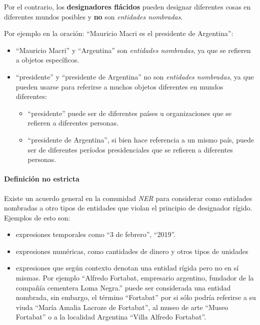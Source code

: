 \documentclass[12pt,a4paper,]{scrartcl}
\providecommand{\tightlist}{%
  \setlength{\itemsep}{0pt}\setlength{\parskip}{0pt}}
\let\oldparagraph\paragraph
\renewcommand{\paragraph}[1]{\oldparagraph{#1}\mbox{}}
\begin{document}
Por el contrario, los \textbf{designadores flácidos} pueden designar diferentes cosas en diferentes mundos posibles y \textbf{no} son \emph{entidades nombradas}.

Por ejemplo en la oración: \enquote{Mauricio Macri es el presidente de Argentina}:

\begin{itemize}
\tightlist
\item
  \enquote{Mauricio Macri} y \enquote{Argentina} son \emph{entidades nombradas}, ya que se refieren a objetos específicos.
\item
  \enquote{presidente} y \enquote{presidente de Argentina} no son \emph{entidades nombradas}, ya que pueden usarse para referirse a muchos objetos diferentes en mundos diferentes:

  \begin{itemize}
  \tightlist
  \item
    \enquote{presidente} puede ser de diferentes países u organizaciones que se refieren a diferentes personas.
  \item
    \enquote{presidente de Argentina}, si bien hace referencia a un mismo país, puede ser de diferentes períodos presidenciales que se refieren a diferentes personas.
  \end{itemize}
\end{itemize}

\hypertarget{definiciuxf3n-no-estricta}{%
\paragraph{Definición no estricta}\label{definiciuxf3n-no-estricta}}

Existe un acuerdo general en la comunidad \emph{NER} para considerar como entidades nombradas a otro tipos de entidades que violan el principio de designador rígido. Ejemplos de esto son:

\begin{itemize}
\tightlist
\item
  expresiones temporales como \enquote{3 de febrero}, \enquote{2019}.
\item
  expresiones numéricas, como cantidades de dinero y otros tipos de unidades
\item
  expresiones que según contexto denotan una entidad rígida pero no en sí mismas. Por ejemplo \enquote{Alfredo Fortabat, empresario argentino, fundador de la compañía cementera Loma Negra.} puede ser considerada una entidad nombrada, sin embargo, el término \enquote{Fortabat} por si sólo podría referirse a su viuda \enquote{María Amalia Lacroze de Fortabat}, al museo de arte \enquote{Museo Fortabat} o a la localidad Argentina \enquote{Villa Alfredo Fortabat}.
\end{itemize}
\end{document}

